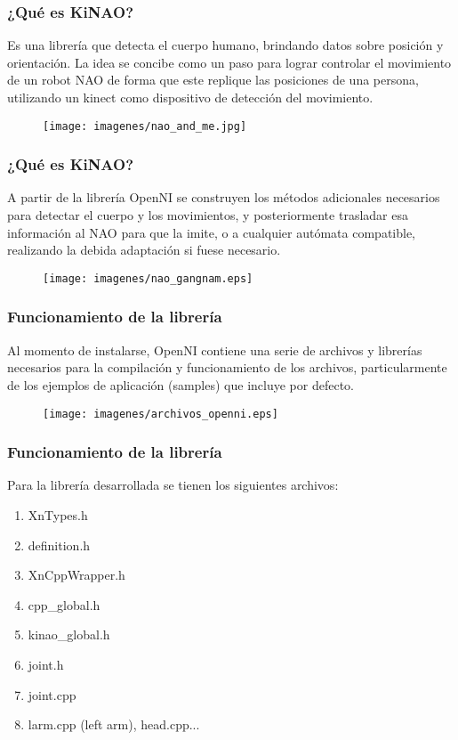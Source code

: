 \documentclass{beamer}
\begin{document}
	\begin{frame}
		\frametitle{¿Qué es KiNAO?}
		Es una librería que detecta el cuerpo humano, brindando datos sobre posición y orientación. La idea se  concibe como un paso para lograr controlar el movimiento de un robot NAO de forma que este replique las posiciones de una persona, utilizando un kinect como dispositivo de detección del movimiento.

		\begin{figure}
			\texttt{[image: imagenes/nao\_and\_me.jpg]}
		\end{figure}

	\end{frame}
	\begin{frame}
		\frametitle{¿Qué es KiNAO?}
		A partir de  la librería OpenNI se construyen los métodos adicionales necesarios para detectar el cuerpo y los movimientos, y posteriormente trasladar esa información al NAO para que la imite, o a cualquier autómata compatible, realizando la debida adaptación si fuese necesario.

		\begin{figure}
			\texttt{[image: imagenes/nao\_gangnam.eps]}
		\end{figure}

	\end{frame}
	\begin{frame}
		\frametitle{Funcionamiento de la librería}
		Al momento de instalarse, OpenNI contiene una serie de archivos y librerías necesarios para la compilación y funcionamiento de los archivos, particularmente de los ejemplos de aplicación (samples) que incluye por defecto.

		\begin{figure}
			\texttt{[image: imagenes/archivos\_openni.eps]}
		\end{figure}

	\end{frame}	%
	\begin{frame}
		\frametitle{Funcionamiento de la librería}
		Para la librería desarrollada se tienen los siguientes archivos:

		\begin{enumerate}
			\item XnTypes.h
			\item definition.h
			\item XnCppWrapper.h	
			\item cpp\_global.h	
			\item kinao\_global.h
			\item joint.h
			\item joint.cpp
			\item larm.cpp (left arm), head.cpp...
		\end{enumerate}

	\end{frame}
\end{document}
